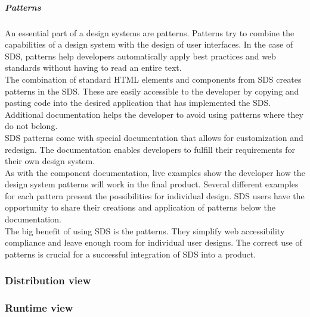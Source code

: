 \subparagraph{Patterns}
An essential part of a design systems are patterns. Patterns try to combine the capabilities of a design system with the design of user interfaces. In the case of \ac{SDS}, patterns help developers automatically apply best practices and web standards without having to read an entire text. \\

The combination of standard HTML elements and components from SDS creates patterns in the SDS. These are easily accessible to the developer by copying and pasting code into the desired application that has implemented the SDS. Additional documentation helps the developer to avoid using patterns where they do not belong. \\

SDS patterns come with special documentation that allows for customization and redesign. The documentation enables developers to fulfill their requirements for their own design system.\\

As with the component documentation, live examples show the developer how the design system patterns will work in the final product. Several different examples for each pattern present the possibilities for individual design. \ac{SDS} users have the opportunity to share their creations and application of patterns below the documentation. \\

The big benefit of using SDS is the patterns. They simplify web accessibility compliance and leave enough room for individual user designs. The correct use of patterns is crucial for a successful integration of \ac{SDS} into a product.

\subsubsection{Distribution view}
\subsubsection{Runtime view}
